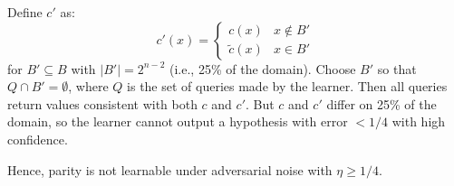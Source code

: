 \documentclass[11pt]{article}
\DeclareMathOperator{\1}{\mathbbm{1}}
\begin{document}
Define $c'$ as:
\[
c'(x) = \begin{cases}c(x) & x \notin B' \\ \tilde{c}(x) & x \in B'\end{cases}
\]
for $B' \subseteq B$ with $|B'| = 2^{n-2}$ (i.e., 25\% of the domain). Choose $B'$ so that $Q \cap B' = \emptyset$, where $Q$ is the set of queries made by the learner. Then all queries return values consistent with both $c$ and $c'$. But $c$ and $c'$ differ on 25\% of the domain, so the learner cannot output a hypothesis with error $<1/4$ with high confidence.

Hence, parity is not learnable under adversarial noise with $\eta \ge 1/4$.
\end{document}
